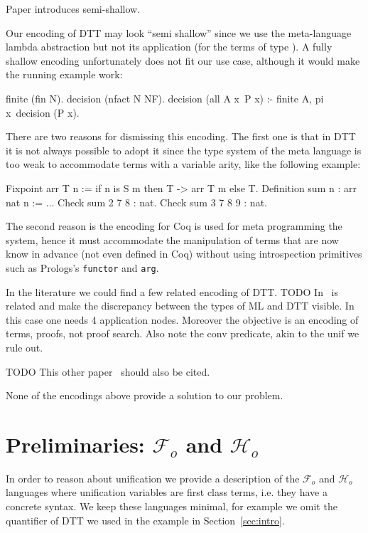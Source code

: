 \documentclass[sigconf,natbib=false]{acmart}
\newcommand{\Fo}{\ensuremath{\mathcal{F}_{\!o}\xspace}} %
\newcommand{\Ho}{\ensuremath{\mathcal{H}_o}\xspace}
\begin{document}
Paper \cite{10.1145/2966268.2966272} introduces semi-shallow.

Our encoding of DTT may look ``semi shallow'' since we use the meta-language
lambda abstraction but not its application (for the terms of type ).
A fully shallow encoding unfortunately does not fit our use case, although
it would make the running example work:

\begin{elpicode}
finite (fin N).
decision (nfact N NF).
decision (all A x\ P x) :- finite A, pi x\ decision (P x).
\end{elpicode}

\noindent
There are two reasons for dismissing this encoding. The first one is that
in DTT it is not always possible to adopt it since the type system
of the meta language is too weak to accommodate terms with a variable arity,
like the following example:

\begin{coqcode}
Fixpoint arr T n := if n is S m then T -> arr T m else T.
Definition sum n : arr nat n := ...
Check sum 2   7 8   : nat.
Check sum 3   7 8 9 : nat.
\end{coqcode}

\noindent
The second reason is the encoding for Coq is used for meta programming the
system, hence it must accommodate the manipulation of terms that are now
know in advance (not even defined in Coq) without using introspection
primitives such as Prologs's \texttt{functor} and \texttt{arg}.

In the literature we could find a few related encoding of DTT.
TODO In~\cite{felty93lics} is related and make the
discrepancy between the types of ML and DTT visible. In this case
one needs 4 application nodes. Moreover the objective is an encoding
of terms, proofs, not proof search. Also note the conv predicate,
akin to the unif we rule out.

TODO This other paper~\cite{10.1007/978-3-031-38499-8_25} should also be cited.

None of the encodings above provide a solution to our problem.

\section{Preliminaries: \Fo{} and \Ho}
\label{sec:lang-spec}

In order to reason about unification we provide a description of the
\Fo{} and \Ho languages where unification variables
are first class terms, i.e. they have a concrete syntax. We keep these languages
minimal, for example we omit the  quantifier of DTT we used
in the example in Section~\ref{sec:intro}. 
%
\setlength{\abovecaptionskip}{0pt}
\setlength{\belowcaptionskip}{-13pt}
\end{document}
